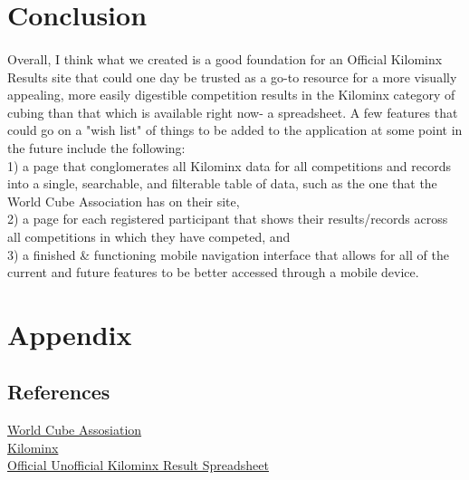 \documentclass[12pt]{article}
\newcommand\tab[1][1cm]{\hspace*{#1}}
\begin{document}
	\section{Conclusion}
		\paragraph*{}
			Overall, I think what we created is a good foundation for an Official Kilominx Results site that could one day be trusted as a go-to resource for a more visually appealing, more easily digestible competition results in the Kilominx category of cubing than that which is available right now- a spreadsheet. A few features that could go on a "wish list" of things to be added to the application at some point in the future include the following:\\
			\tab 1) a page that conglomerates all Kilominx data for all competitions and records into 
			\tab a single, searchable, and filterable table of data, such as the one that the World Cube 
			\tab Association has on their site,\\ 
			\tab 2) a page for each registered participant that shows their results/records across all 
			\tab competitions in which they have competed, and\\ 
			\tab 3) a finished \& functioning mobile navigation interface that allows for all of the current 
			\tab and future features to be better accessed through a mobile device.

	\section{Appendix}
		\subsection{References}
			\href{https://www.worldcubeassociation.org/}{World Cube Assosiation}\\
			\href{https://ruwix.com/twisty-puzzles/kilominx/}{Kilominx}\\
			\href{https://docs.google.com/spreadsheets/d/1p8uFFILT2TkmkTodaHzeDHiWBjfqUz7YUGaOslbyR2A/edit?usp=sharing}{Official Unofficial Kilominx Result Spreadsheet}
\end{document}
